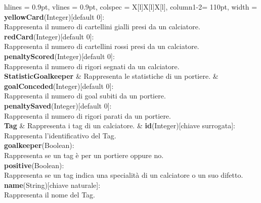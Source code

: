 \begin{tblr}{
    hlines = {0.9pt}, vlines = {0.9pt}, colspec = {X[l]X[l]X[l]}, column{1-2}= {110pt},
    width = \textwidth
}
{		\medskip\textbf{yellowCard}(Integer)[default 0]:\\
			Rappresenta il numero di cartellini gialli
			presi da un calciatore.\\
		\medskip\textbf{redCard}(Integer)[default 0]:\\
			Rappresenta il numero di cartellini rossi
			presi da un calciatore.\\
		\medskip\textbf{penaltyScored}(Integer)[default 0]:\\
			Rappresenta il numero di rigori segnati
			da un calciatore.
	}
	\\
	{
		\textbf{StatisticGoalkeeper}
	}
	&
	{
		Rappresenta le statistiche di un portiere.
	}
	&
	{
		\textbf{goalConceded}(Integer)[default 0]:\\
			Rappresenta il numero di goal subiti
			da un portiere.\\
		\medskip\textbf{penaltySaved}(Integer)[default 0]:\\
			Rappresenta il numero di rigori parati
			da un portiere.
	}
	\\
	{
		\textbf{Tag}
	}
	&
	{
		Rappresenta i tag di un calciatore.
	}
	&
	{
		\textbf{id}(Integer)[chiave surrogata]:\\Rappresenta
			l'identificativo del Tag.\\
		\medskip\textbf{goalkeeper}(Boolean):\\
			Rappresenta se un tag è per un portiere oppure no.\\
		\medskip\textbf{positive}(Boolean):\\
			Rappresenta se un tag indica una specialità
			di un calciatore o un suo difetto.\\
		\medskip\textbf{name}(String)[chiave naturale]:
			\\Rappresenta il nome del Tag.
	}
	\\
\end{tblr}

\newpage

